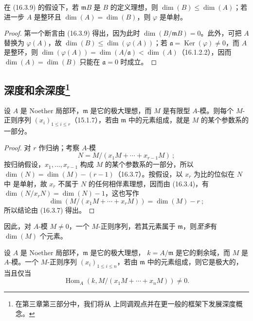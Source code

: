 \begin{corollary}[16.3.10]
\label{0.16.3.10-fr}
在 (16.3.9) 的假设下，若 $\mathfrak{m}B$ 是 $B$ 的定义理想，则
$\dim(B)\leq\dim(A)$；若进一步 $A$ 是整环且 $\dim(A)=\dim(B)$，则
$\varphi$ 是单射。
\end{corollary}

\begin{proof}
第一个断言由 (16.3.9) 得出，因为此时 $\dim(B/\mathfrak{m}B)=0$。此外，可把
$A$ 替换为 $\varphi(A)$，故 $\dim(B)\leq\dim(\varphi(A))$；若
$\mathfrak{a}=\operatorname{Ker}(\varphi)\neq0$，而 $A$ 是整环，则
$\dim(\varphi(A))=\dim(A/\mathfrak{a})<\dim(A)$（16.1.2.2），因而
$\dim(A)=\dim(B)$ 只能在 $\mathfrak{a}=0$ 时成立。
\end{proof}

\subsection[深度和余深度]{深度和余深度\protect\footnote{在第三章第三部分中，我们将从
上同调观点并在更一般的框架下发展深度概念。}}
\label{subsection:0.16.4-fr}

\begin{proposition}[16.4.1]
\label{0.16.4.1-fr}
设 $A$ 是 Noether 局部环，$\mathfrak{m}$ 是它的极大理想，而 $M$ 是有限型
$A$-模。则每个 $M$-正则序列 $(x_i)_{1\leq i\leq r}$（15.1.7），若由
$\mathfrak{m}$ 中的元素组成，就是 $M$ 的某个参数系的一部分。
\end{proposition}

\begin{proof}
对 $r$ 作归纳；考察 $A$-模
\[
  N=M/(x_1M+\cdots+x_{r-1}M)~;
\]
按归纳假设，$x_1,\ldots,x_{r-1}$ 构成 $M$ 的某个参数系的一部分，所以
$\dim(N)=\dim(M)-(r-1)$（16.3.7）。按假设，以 $x_r$ 为比的位似在 $N$ 中
是单射，故 $x_r$ 不属于 $N$ 的任何相伴素理想，因而由 (16.3.4)，有
$\dim(N/x_rN)=\dim(N)-1$，这也写作
\[
  \dim(M/(x_1M+\cdots+x_rM))=\dim(M)-r~;
\]
所以结论由 (16.3.7) 得出。
\end{proof}

因此，对 $A$-模 $M\neq0$，一个 $M$-正则序列，若其元素属于
$\mathfrak{m}$，则\emph{至多}有 $\dim(M)$ 个元素。

\begin{lemma}[16.4.2]
\label{0.16.4.2-fr}
设 $A$ 是 Noether 局部环，$\mathfrak{m}$ 是它的极大理想，
$k=A/\mathfrak{m}$ 是它的剩余域，而 $M$ 是 $A$-模。一个 $M$-正则序列
$(x_i)_{1\leq i\leq n}$，若由 $\mathfrak{m}$ 中的元素组成，则它是极大的，
当且仅当
\[
  \operatorname{Hom}_A(k,M/(x_1M+\cdots+x_nM))\neq0.
\]
\end{lemma}

